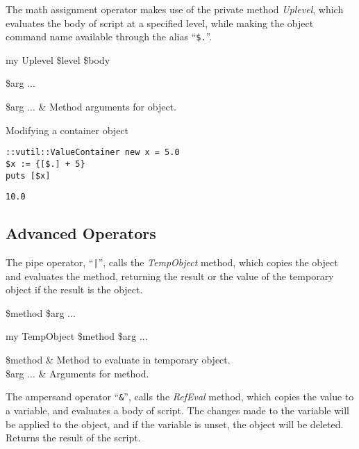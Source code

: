 \documentclass{article}
\begin{document}
The math assignment operator makes use of the private method \textit{Uplevel}, which evaluates the body of script at a specified level, while making the object command name available through the alias ``\texttt{\$.}''.
\begin{syntax}
my Uplevel \$level \$body
\end{syntax}

\begin{syntax}
 \$arg ...
\end{syntax}
\begin{args}
\$arg ... & Method arguments for object.
\end{args}

\begin{example}{Modifying a container object}
\begin{lstlisting}
::vutil::ValueContainer new x = 5.0
$x := {[$.] + 5}
puts [$x]
\end{lstlisting}
\tcblower
\begin{lstlisting}
10.0
\end{lstlisting}
\end{example}

\clearpage
\subsection{Advanced Operators}
The pipe operator, ``\texttt{|}'', calls the \textit{TempObject} method, which copies the object and evaluates the method, returning the result or the value of the temporary object if the result is the object.
\begin{syntax}
 \$method \$arg ... 
\end{syntax}
\begin{syntax}
my TempObject \$method \$arg ...
\end{syntax}

\begin{args}
\$method & Method to evaluate in temporary object. \\
\$arg ... & Arguments for method.
\end{args}

The ampersand operator ``\texttt{\&}'', calls the \textit{RefEval} method, which copies the value to a variable, and evaluates a body of script. 
The changes made to the variable will be applied to the object, and if the variable is unset, the object will be deleted.
Returns the result of the script.
\end{document}
